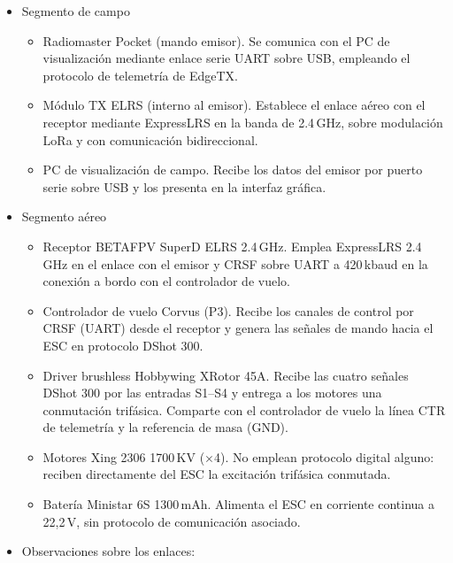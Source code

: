 \documentclass[12pt, letterpaper]{report}
\begin{document}
\begin{itemize}
    \item Segmento de campo
    \begin{itemize}
        \item Radiomaster Pocket (mando emisor).
    Se comunica con el PC de visualización mediante enlace serie UART sobre USB,
    empleando el protocolo de telemetría de EdgeTX.

        \item Módulo TX ELRS (interno al emisor).
    Establece el enlace aéreo con el receptor mediante ExpressLRS en la banda de
    2.4\,GHz, sobre modulación LoRa y con comunicación bidireccional.

        \item PC de visualización de campo.
    Recibe los datos del emisor por puerto serie sobre USB y los presenta en la
    interfaz gráfica.
    \end{itemize}

     \item Segmento aéreo
     \begin{itemize}
       \item Receptor BETAFPV SuperD ELRS 2.4\,GHz.
    Emplea ExpressLRS 2.4\,GHz en el enlace con el emisor y CRSF sobre UART a
    420\,kbaud en la conexión a bordo con el controlador de vuelo.

        \item Controlador de vuelo Corvus (P3).
    Recibe los canales de control por CRSF (UART) desde el receptor y genera las
    señales de mando hacia el ESC en protocolo DShot 300.

        \item Driver brushless Hobbywing XRotor 45A.
    Recibe las cuatro señales DShot 300 por las entradas S1--S4 y entrega a los
    motores una conmutación trifásica. Comparte con el controlador de vuelo la
    línea CTR de telemetría y la referencia de masa (GND).

        \item Motores Xing 2306 1700\,KV ($\times$4).
    No emplean protocolo digital alguno: reciben directamente del ESC la
    excitación trifásica conmutada.

        \item Batería Ministar 6S 1300\,mAh.
    Alimenta el ESC en corriente continua a 22{,}2\,V, sin protocolo de
    comunicación asociado.
    \end{itemize}
    \item Observaciones sobre los enlaces:


\end{itemize}
\end{document}
